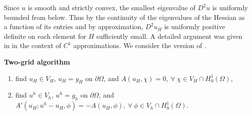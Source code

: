 \documentclass[12pt]{amsart}
\numberwithin{equation}{section}
\begin{document}
Since $u$ is smooth and strictly convex, the smallest eigenvalue of $D^2 u$ is uniformly bounded from below. Thus by the continuity of the eigenvalues of the Hessian as a function of its entries and by approximation, $D^2 u_H$ is uniformly positive definite on each element
 for $H$ sufficiently small. A detailed argument was given in \cite[Lemma 4]{AwanouPseudo10} in the context of $C^1$ approximations. We consider the version of \cite[Algorithm 5.5]{Xu1996}. 

{\bf Two-grid algorithm}

\begin{enumerate} \label{2grid-alg1}
\item[1.]
find $u_H \in V_H$, $u_H=g_H$ on $\partial \Omega$, and $A(u_H,\chi) = 0, ~ \forall ~\chi \in  V_H\cap H^1_0(\Omega)$,
\item[2.]  find $u^h \in V_h$, $u^h=g_h$ on $\partial \Omega$, and $A'(u_H;u^h-u_H,\phi)=-A(u_H,\phi),  ~\forall ~\phi \in  V_h\cap H^1_0(\Omega)$.
\end{enumerate}
\end{document}
